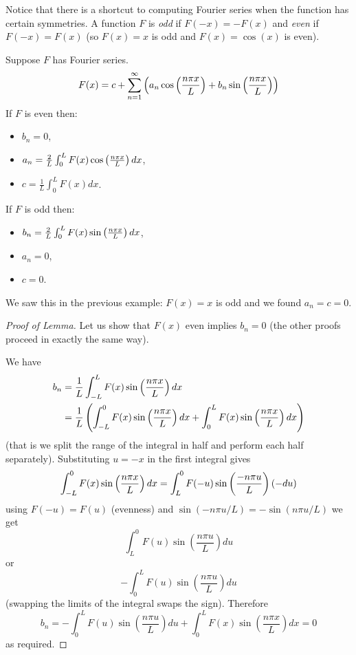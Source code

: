 Notice that there is a shortcut to computing Fourier series when the function has certain symmetries. A function $F$ is {\em odd} if $F(-x)=-F(x)$ and {\em even} if $F(-x)=F(x)$ (so $F(x)=x$ is odd and $F(x)=\cos(x)$ is even).
\begin{lma}
Suppose $F$ has Fourier series.
\[F(x)=c+\sum_{n=1}^{\infty}\left(a_n\cos\left(\frac{n \pi x}{L}\right)+b_n\sin\left(\frac{n \pi x}{L}\right)\right)\]
If $F$ is even then:
\begin{itemize}
\item $b_n=0$,
\item $a_n=\frac{2}{L}\int_0^LF(x)\cos\left(\frac{n \pi x}{L}\right)dx$,
\item $c=\frac{1}{L}\int_0^LF(x)dx$.
\end{itemize}
If $F$ is odd then:
\begin{itemize}
\item $b_n=\frac{2}{L}\int_0^LF(x)\sin\left(\frac{n \pi x}{L}\right)dx$,
\item $a_n=0$,
\item $c=0$.
\end{itemize}
\end{lma}
We saw this in the previous example: $F(x)=x$ is odd and we found $a_n=c=0$.
\begin{proof}[Proof of Lemma]
Let us show that $F(x)$ even implies $b_n=0$ (the other proofs proceed in exactly the same way).

We have
\begin{align*}
b_n&=\frac{1}{L}\int_{-L}^LF(x)\sin\left(\frac{n \pi x}{L}\right)dx\\
   &=\frac{1}{L}\left(\int_{-L}^0F(x)\sin\left(\frac{n \pi x}{L}\right)dx+\int_0^LF(x)\sin\left(\frac{n \pi x}{L}\right)dx\right)
\end{align*}
(that is we split the range of the integral in half and perform each half separately). Substituting $u=-x$ in the first integral gives
\[\int_{-L}^0F(x)\sin\left(\frac{n \pi x}{L}\right)dx=\int_{L}^0F(-u)\sin\left(\frac{-n\pi u}{L}\right)(-du)\]
using $F(-u)=F(u)$ (evenness) and $\sin(-n\pi u/L)=-\sin(n\pi u/L)$ we get
\[\int_L^0F(u)\sin\left(\frac{n\pi u}{L}\right)du\]
or
\[-\int_0^LF(u)\sin\left(\frac{n\pi u}{L}\right)du\]
(swapping the limits of the integral swaps the sign). Therefore
\[b_n=-\int_0^LF(u)\sin\left(\frac{n\pi u}{L}\right)du+\int_0^LF(x)\sin\left(\frac{n\pi x}{L}\right)dx=0\]
as required.
\end{proof}

